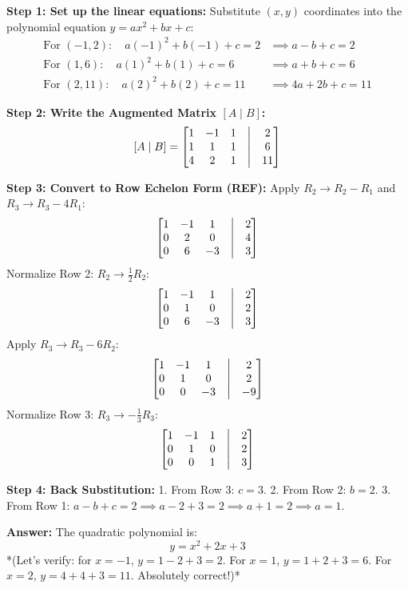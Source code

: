 \documentclass[11pt,a4paper]{article}
\begin{document}
\begin{solutionbox}
\textbf{Step 1: Set up the linear equations:}
Substitute $(x, y)$ coordinates into the polynomial equation $y = ax^2 + bx + c$:
\begin{align*}
\text{For } (-1, 2): \quad a(-1)^2 + b(-1) + c = 2 &\implies a - b + c = 2 \\
\text{For } (1, 6): \quad a(1)^2 + b(1) + c = 6 &\implies a + b + c = 6 \\
\text{For } (2, 11): \quad a(2)^2 + b(2) + c = 11 &\implies 4a + 2b + c = 11
\end{align*}

\textbf{Step 2: Write the Augmented Matrix $[A \mid B]$:}
\[ [A \mid B] = \begin{bmatrix} 1 & -1 & 1 & \bigm| & 2 \\ 1 & 1 & 1 & \bigm| & 6 \\ 4 & 2 & 1 & \bigm| & 11 \end{bmatrix} \]

\textbf{Step 3: Convert to Row Echelon Form (REF):}
Apply $R_2 \to R_2 - R_1$ and $R_3 \to R_3 - 4R_1$:
\[ \begin{bmatrix} 1 & -1 & 1 & \bigm| & 2 \\ 0 & 2 & 0 & \bigm| & 4 \\ 0 & 6 & -3 & \bigm| & 3 \end{bmatrix} \]
Normalize Row 2: $R_2 \to \frac{1}{2} R_2$:
\[ \begin{bmatrix} 1 & -1 & 1 & \bigm| & 2 \\ 0 & 1 & 0 & \bigm| & 2 \\ 0 & 6 & -3 & \bigm| & 3 \end{bmatrix} \]
Apply $R_3 \to R_3 - 6R_2$:
\[ \begin{bmatrix} 1 & -1 & 1 & \bigm| & 2 \\ 0 & 1 & 0 & \bigm| & 2 \\ 0 & 0 & -3 & \bigm| & -9 \end{bmatrix} \]
Normalize Row 3: $R_3 \to -\frac{1}{3} R_3$:
\[ \begin{bmatrix} 1 & -1 & 1 & \bigm| & 2 \\ 0 & 1 & 0 & \bigm| & 2 \\ 0 & 0 & 1 & \bigm| & 3 \end{bmatrix} \]

\textbf{Step 4: Back Substitution:}
1. From Row 3: $c = 3$.
2. From Row 2: $b = 2$.
3. From Row 1: $a - b + c = 2 \implies a - 2 + 3 = 2 \implies a + 1 = 2 \implies a = 1$.

\textbf{Answer:} The quadratic polynomial is:
\[ y = x^2 + 2x + 3 \]
*(Let's verify: for $x=-1$, $y = 1-2+3=2$. For $x=1$, $y=1+2+3=6$. For $x=2$, $y=4+4+3=11$. Absolutely correct!)*
\end{solutionbox}
\end{document}
